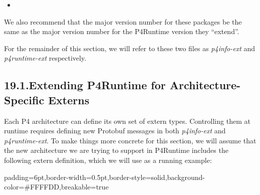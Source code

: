 \documentclass[11pt]{article}
\begin{document}
{\begin{itemize}[noitemsep,topsep=\mdcompacttopsep]
\item{}%
\end{itemize}%

\noindent{}We also recommend that the major version number for these packages be the same
as the major version number for the P4Runtime version they \textquotedblleft{}extend\textquotedblright{}.%

For the remainder of this section, we will refer to these two files as
\emph{p4info-ext} and \emph{p4runtime-ext} respectively.%

\subsection{19.1.\hspace*{0.5em}Extending P4Runtime for Architecture-Specific Externs}\label{sec-extending-p4runtime-for-architecture-specific-externs}%

\noindent{}Each P4 architecture can define its own set of extern types. Controlling them at
runtime requires defining new Protobuf messages in both \emph{p4info-ext} and
\emph{p4runtime-ext}. To make things more concrete for this section, we will assume
that the new architecture we are trying to support in P4Runtime includes the
following extern definition, which we will use as a running example:%

\begin{mdbmargintb}{6pt}{6pt}%
\begin{mdblock}{padding=6pt,border-width=0.5pt,border-style=solid,background-color=\#FFFFDD,breakable=true}%
\begin{mdpre}%
\end{mdpre}%
\end{mdblock}%
\end{mdbmargintb}%

}
\end{document}
